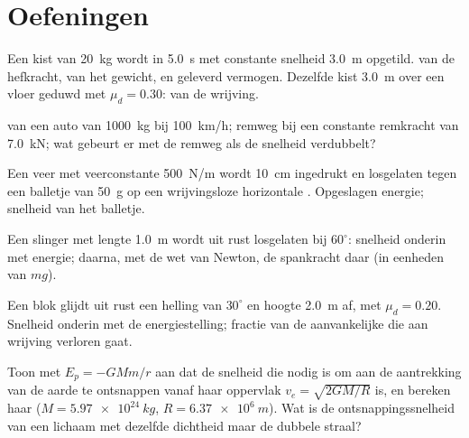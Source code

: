 \section{Oefeningen}

\begin{exercise}[$\star$]\label{exo:b1:work-and-energy:1}
Een kist van \qty{20}{kg} wordt in \qty{5.0}{s} met constante snelheid
\qty{3.0}{m} opgetild.  van de hefkracht, van het gewicht, en geleverd
vermogen. Dezelfde kist \qty{3.0}{m} over een vloer geduwd met
$\mu_d = 0.30$:  van de wrijving.
\end{exercise}

\begin{exercise}[$\star$]\label{exo:b1:work-and-energy:2}
 van een auto van \qty{1000}{kg} bij \qty{100}{km/h}; remweg
bij een constante remkracht van \qty{7.0}{kN}; wat gebeurt er met
de remweg als de snelheid verdubbelt?
\end{exercise}

\begin{exercise}[$\star$]\label{exo:b1:work-and-energy:3}
Een veer met veerconstante \qty{500}{N/m} wordt \qty{10}{cm} ingedrukt en
losgelaten tegen een balletje van \qty{50}{g} op een wrijvingsloze horizontale .
Opgeslagen energie; snelheid van het balletje.
\end{exercise}

\begin{exercise}[$\star$]\label{exo:b1:work-and-energy:4}
Een slinger met lengte \qty{1.0}{m} wordt uit rust losgelaten bij $60^\circ$:
snelheid onderin met energie; daarna, met de wet van Newton, de spankracht
daar (in eenheden van $mg$).
\end{exercise}

\begin{exercise}[$\star\star$]\label{exo:b1:work-and-energy:5}
Een blok glijdt uit rust een helling van $30^\circ$ en hoogte \qty{2.0}{m} af,
met $\mu_d = 0.20$. Snelheid onderin met de energiestelling; fractie van
de aanvankelijke  die aan wrijving verloren gaat.
\end{exercise}

\begin{exercise}[$\star\star$]\label{exo:b1:work-and-energy:6}
Toon met $E_p = -GMm/r$ aan dat de snelheid die nodig is om aan de
aantrekking van de aarde te ontsnappen vanaf haar oppervlak $v_e = \sqrt{2GM/R}$ is, en bereken haar
($M = \qty{5.97e24}{kg}$, $R = \qty{6.37e6}{m}$). Wat is de
ontsnappingssnelheid van een lichaam met dezelfde dichtheid maar de dubbele straal?
\end{exercise}


